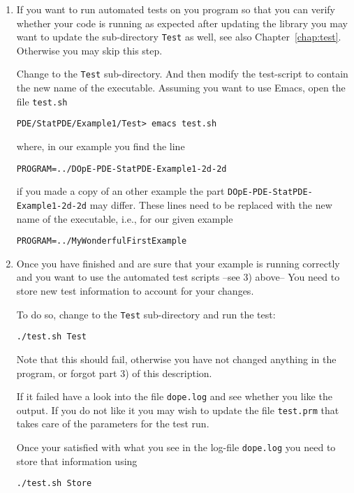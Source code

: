 \begin{enumerate}
\item If you want to run automated tests on you program so that you can 
  verify whether your code is running as expected after updating the 
  library you may want to update the sub-directory \texttt{Test} 
  as well, see also Chapter~\ref{chap:test}. Otherwise you may skip this 
  step.

  Change to the \texttt{Test} sub-directory. And then modify the
  test-script to contain the new name of the executable.
  Assuming you want to use Emacs, open the file \texttt{test.sh}
\begin{verbatim}
PDE/StatPDE/Example1/Test> emacs test.sh
\end{verbatim}
  where, in our example you find the line
\begin{verbatim}
PROGRAM=../DOpE-PDE-StatPDE-Example1-2d-2d
\end{verbatim} 
  if you made a copy of an other example the part \texttt{DOpE-PDE-StatPDE-Example1-2d-2d}
  may differ. These lines need to be replaced with the new name of the 
  executable, i.e., for our given example
\begin{verbatim}
PROGRAM=../MyWonderfulFirstExample
\end{verbatim} 
    
\item Once you have finished and are sure that your example is running correctly
  and you want to use the automated test scripts --see 3) above-- You need 
  to store new test information to account for your changes. 
  
  To do so, change to the \texttt{Test} sub-directory and run the test:
\begin{verbatim}
./test.sh Test
\end{verbatim}
  Note that this should fail, otherwise you have not changed anything in the program, 
  or forgot part 3) of this description.
  
  If it failed have a look into the file \texttt{dope.log} and see whether you like the 
  output. If you do not like it you may wish to update the file \texttt{test.prm} that 
  takes care of the parameters for the test run.
  
  Once your satisfied with what you see in the log-file \texttt{dope.log} you need to store 
  that information using
\begin{verbatim}
./test.sh Store
\end{verbatim}
\end{enumerate}


